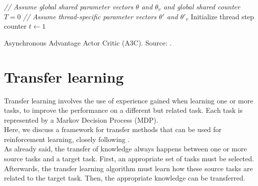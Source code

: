 \documentclass[a4paper, 11pt]{article}
\begin{document}
\begin{algorithm}[htb]
\DontPrintSemicolon
\emph{// Assume global shared parameter vectors $\theta$ and $\theta_v$ and global shared counter $T=0$}\;
\emph{// Assume thread-specific parameter vectors $\theta'$ and $\theta'_v$}\;
Initialize thread step counter $t\gets 1$\;
\caption[Asynchronous Advantage Actor Critic]{Asynchronous Advantage Actor Critic (A3C). Source: \cite{Mnih2016AsynchronousLearning}.}
\label{algo:a3c}
\end{algorithm}

\section{Transfer learning}
Transfer learning involves the use of experience gained when learning one or more tasks, to improve the performance on a different but related task. Each task is represented by a Markov Decision Process (MDP).\\  Here, we discuss a framework for transfer methods that can be used for reinforcement learning, closely following \cite{Taylor2009TransferSurvey}.\\

As already said, the transfer of knowledge always happens between one or more source tasks and a target task. First, an appropriate set of tasks must be selected. Afterwards, the transfer learning algorithm must learn how these source tasks are related to the target task. Then, the appropriate knowledge can be transferred.\\
\end{document}
